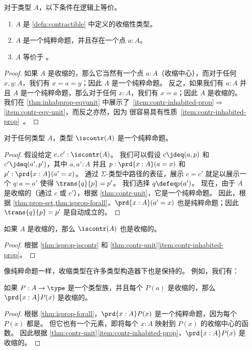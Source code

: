 \begin{lem}\label{thm:contr-unit}
对于类型 $A$，以下条件在逻辑上等价。
\begin{enumerate}
  \item $A$ 是 \cref{defn:contractible} 中定义的收缩性类型。\label{item:contr}
  \item $A$ 是一个纯粹命题，并且存在一个点 $a:A$。\label{item:contr-inhabited-prop}
  \item $A$ 等价于 \unit。\label{item:contr-eqv-unit}
\end{enumerate}
\end{lem}
\begin{proof}
  如果 $A$ 是收缩的，那么它当然有一个点 $a:A$（收缩中心），而对于任何 $x,y:A$，我们有 $x=a=y$；因此 $A$ 是一个纯粹命题。
  反之，如果我们有 $a:A$ 并且 $A$ 是一个纯粹命题，那么对于任何 $x:A$，我们有 $x=a$；因此 $A$ 是收缩的。
  我们在 \cref{thm:inhabprop-eqvunit} 中展示了~\ref{item:contr-inhabited-prop}$\Rightarrow$\ref{item:contr-eqv-unit}，而反之亦然，因为 \unit 很容易具有性质~\ref{item:contr-inhabited-prop}。
\end{proof}

\begin{lem}\label{thm:isprop-iscontr}
对于任何类型 $A$，类型 $\iscontr(A)$ 是一个纯粹命题。
\end{lem}
\begin{proof}
  假设给定 $c,c':\iscontr(A)$。
  我们可以假设 $c\jdeq(a,p)$ 和 $c'\jdeq(a',p')$，其中 $a,a':A$ 并且 $p:\prd{x:A} (a=x)$ 和 $p':\prd{x:A} (a'=x)$。
  通过 $\Sigma$-类型中路径的表征，展示 $c=c'$ 就足以展示一个 $q:a=a'$ 使得 $\trans{q}{p}=p'$。
  我们选择 $q\defeq p(a')$。
  现在，由于 $A$ 是收缩的（通过 $c$ 或 $c'$），根据 \cref{thm:contr-unit}，它是一个纯粹命题。
  因此，根据 \cref{thm:prop-set,thm:isprop-forall}，$\prd{x:A}(a'=x)$ 也是纯粹命题；因此 $\trans{q}{p}=p'$ 是自动成立的。
\end{proof}

\begin{cor}\label{thm:contr-contr}
如果 $A$ 是收缩的，那么 $\iscontr(A)$ 也是收缩的。
\end{cor}
\begin{proof}
  根据 \cref{thm:isprop-iscontr} 和 \cref{thm:contr-unit}\ref{item:contr-inhabited-prop}。
\end{proof}

像纯粹命题一样，收缩类型在许多类型构造器下也是保持的。
例如，我们有：

\begin{lem}\label{thm:contr-forall}
如果 $P:A\to\type$ 是一个类型族，并且每个 $P(a)$ 是收缩的，那么 $\prd{x:A} P(x)$ 是收缩的。
\end{lem}
\begin{proof}
  根据 \cref{thm:isprop-forall}，$\prd{x:A} P(x)$ 是一个纯粹命题，因为每个 $P(x)$ 都是。
  但它也有一个元素，即将每个 $x:A$ 映射到 $P(x)$ 的收缩中心的函数。
  因此根据 \cref{thm:contr-unit}\ref{item:contr-inhabited-prop}，$\prd{x:A} P(x)$ 是收缩的。
\end{proof}

